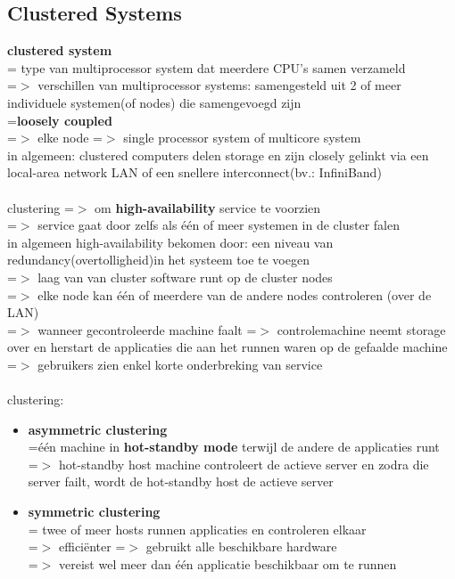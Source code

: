 \documentclass{report}
\begin{document}
\subsection{Clustered Systems}
\textbf{clustered system}
\\= type van multiprocessor system dat meerdere CPU's samen verzameld
\\=$>$ verschillen van multiprocessor systems: samengesteld uit 2 of meer individuele systemen(of nodes) die samengevoegd zijn
\\=\textbf{loosely coupled}
\\=$>$ elke node =$>$ single processor system of multicore system
\\in algemeen: clustered computers delen storage en zijn closely gelinkt via een local-area network LAN of een snellere interconnect(bv.: InfiniBand)
\\
\\ clustering =$>$ om \textbf{high-availability} service te voorzien
\\ =$>$ service gaat door zelfs als \'e\'en of meer systemen in de cluster falen
\\ in algemeen high-availability bekomen door: een niveau van redundancy(overtolligheid)in het systeem toe te voegen
\\ =$>$ laag van van cluster software runt op de cluster nodes
\\=$>$ elke node kan \'e\'en of meerdere van de andere nodes controleren (over de LAN)
\\=$>$ wanneer gecontroleerde machine faalt =$>$ controlemachine neemt storage over en herstart de applicaties die aan het runnen waren op de gefaalde machine
\\=$>$ gebruikers zien enkel korte onderbreking van service
\\
\\clustering:
\begin{itemize}
\item \textbf{asymmetric clustering}
\\=\'e\'en machine in \textbf{hot-standby mode} terwijl de andere de applicaties runt
\\=$>$ hot-standby host machine controleert de actieve server en zodra die server failt, wordt de hot-standby host de actieve server
\item\textbf{symmetric clustering}
\\= twee of meer hosts runnen applicaties en controleren elkaar
\\=$>$ effici\"enter =$>$ gebruikt alle beschikbare hardware
\\=$>$ vereist wel meer dan \'e\'en applicatie beschikbaar om te runnen
\end{itemize}
\end{document}
